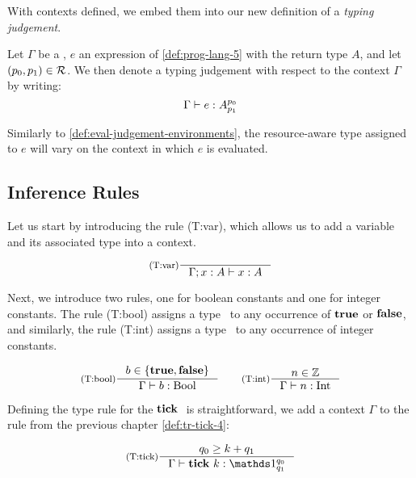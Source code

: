 With contexts defined, we embed them into our new definition of a \emph{typing judgement}.

\begin{definition}\label{def:type-judgement-context}
   Let \(\Gamma\) be a , \(e\) an expression of \cref{def:prog-lang-5} with the return type \(A\), and let \((p_0, p_1) \in \mathcal{R}\). We then denote a typing judgement with respect to the context \(\Gamma\) by writing:
   \[
      \Gamma \vdash e : A ^{p_0}_{p_1}
   \]
\end{definition}

\begin{remark}
   Similarly to \cref{def:eval-judgement-environments}, the resource-aware type assigned to \(e\) will vary on the context in which \(e\) is evaluated. 
\end{remark}

\subsection{Inference Rules}\label{sec:inference-rules-letvar}

Let us start by introducing the rule (T:var), which allows us to add a variable and its associated type into a context.

\[
   \inference[(T:var)]
   {}
   {\typing{\Gamma; x: A}{x}{A}}
\]

Next, we introduce two rules, one for boolean constants and one for integer constants. The rule (T:bool) assigns a type \bool~to any occurrence of \(\mathbf{true}\) or \(\mathbf{false}\), and similarly, the rule (T:int) assigns a type \typeint~to any occurrence of integer constants.

\[
   \inference[(T:bool)]
   {b \in \{\true, \false\}}
   {\typing{\Gamma}{b}{\text{\bool}}}%
   \qquad
   \inference[(T:int)]
   {n \in \mathbb{Z}}
   {\typing{\Gamma}{n}{\text{\typeint}}}
\]

Defining the type rule for the \(\mathbf{tick}~\) is straightforward, we add a context \(\Gamma\) to the rule from the previous chapter \cref{def:tr-tick-4}:

\[
   \inference[(T:tick)]
   {q_0 \geq k + q_1}
   {\typing{\Gamma}{\tick{k}}{\ratype{\unit}{q_0}{q_1}}}
\]

